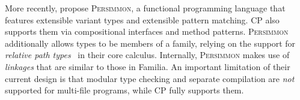 More recently, \citet{kravchuk2024persimmon} propose \textsc{Persimmon}, a
functional programming language that features extensible variant types and
extensible pattern matching. CP also supports them via compositional interfaces
and method patterns. \textsc{Persimmon} additionally allows types to be members
of a family, relying on the support for \emph{relative path
types}~\citep{saito2008lightweight} in their core calculus. Internally,
\textsc{Persimmon} makes use of \emph{linkages} that are similar to those in
Familia. An important limitation of their current design is that modular type
checking and separate compilation are \emph{not} supported for multi-file
programs, while CP fully supports them.